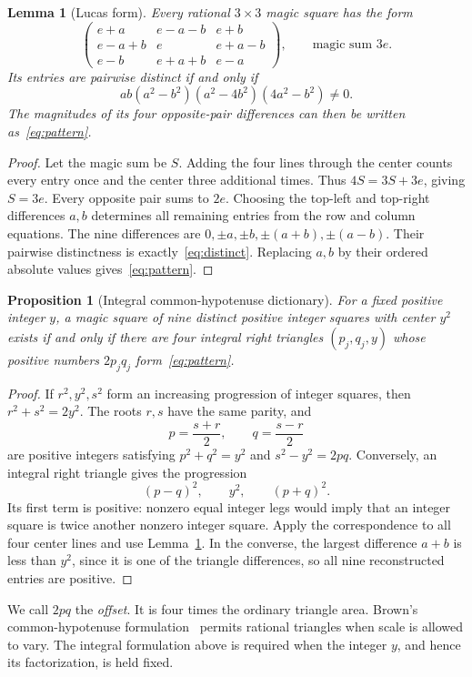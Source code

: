 \documentclass[11pt,letterpaper]{article}
\newtheorem{proposition}[theorem]{Proposition}
\newtheorem{lemma}[theorem]{Lemma}
\theoremstyle{definition}\newtheorem{definition}[theorem]{Definition}
\theoremstyle{remark}\newtheorem{remark}[theorem]{Remark}
\begin{document}
\begin{lemma}[Lucas form]\label{lem:lucas}
Every rational $3\times3$ magic square has the form
\[
 \begin{pmatrix}
 e+a&e-a-b&e+b\\
 e-a+b&e&e+a-b\\
 e-b&e+a+b&e-a
 \end{pmatrix},\qquad\text{magic sum }3e.
\]
Its entries are pairwise distinct if and only if
\begin{equation}\label{eq:distinct}
 ab(a^2-b^2)(a^2-4b^2)(4a^2-b^2)\ne0.
\end{equation}
The magnitudes of its four opposite-pair differences can then be written as~\eqref{eq:pattern}.
\end{lemma}
\begin{proof}
Let the magic sum be $S$. Adding the four lines through the center counts every entry once and the center three additional times. Thus $4S=3S+3e$, giving $S=3e$. Every opposite pair sums to $2e$. Choosing the top-left and top-right differences $a,b$ determines all remaining entries from the row and column equations. The nine differences are $0,\pm a,\pm b,\pm(a+b),\pm(a-b)$. Their pairwise distinctness is exactly~\eqref{eq:distinct}. Replacing $a,b$ by their ordered absolute values gives~\eqref{eq:pattern}.
\end{proof}

\begin{proposition}[Integral common-hypotenuse dictionary]\label{prop:dictionary}
For a fixed positive integer $y$, a magic square of nine distinct positive integer squares with center $y^2$ exists if and only if there are four integral right triangles $(p_j,q_j,y)$ whose positive numbers $2p_jq_j$ form~\eqref{eq:pattern}.
\end{proposition}
\begin{proof}
If $r^2,y^2,s^2$ form an increasing progression of integer squares, then $r^2+s^2=2y^2$. The roots $r,s$ have the same parity, and
\[
 p=\frac{s+r}{2},\qquad q=\frac{s-r}{2}
\]
are positive integers satisfying $p^2+q^2=y^2$ and $s^2-y^2=2pq$. Conversely, an integral right triangle gives the progression
\[
 (p-q)^2,\qquad y^2,\qquad(p+q)^2.
\]
Its first term is positive: nonzero equal integer legs would imply that an integer square is twice another nonzero integer square. Apply the correspondence to all four center lines and use Lemma~\ref{lem:lucas}. In the converse, the largest difference $a+b$ is less than $y^2$, since it is one of the triangle differences, so all nine reconstructed entries are positive.
\end{proof}
We call $2pq$ the \emph{offset}. It is four times the ordinary triangle area. Brown's common-hypotenuse formulation~\cite{Brown511} permits rational triangles when scale is allowed to vary. The integral formulation above is required when the integer $y$, and hence its factorization, is held fixed.
\end{document}
